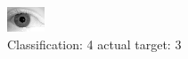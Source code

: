 \begin{figure}[h!]
\begin{center}
\includegraphics[width=0.60\columnwidth]{figures/ID2122_class_4_target_3.png}
\end{center}
\caption{ Classification: 4 actual target: 3}
\label{fig:ID2122_class_4_target_3}
\end{figure}
